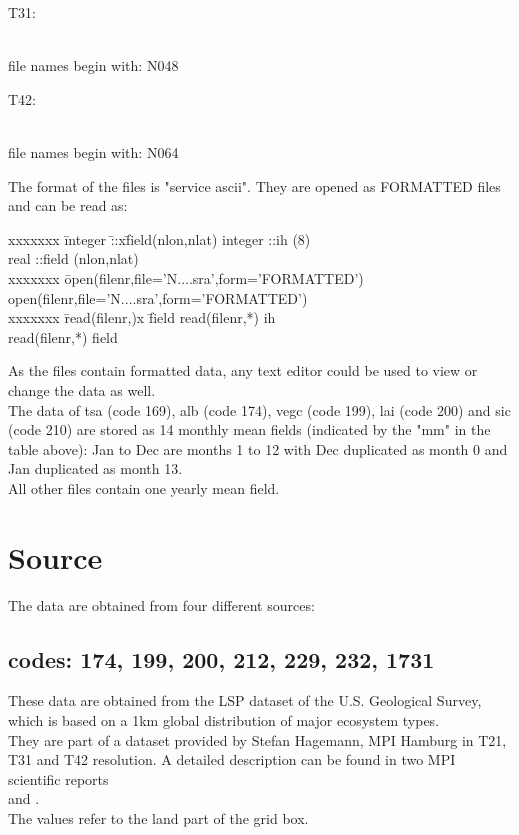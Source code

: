 \vspace{-1.6ex}
\noindent \begin{bf}T31:\end{bf}\\
file names begin with: N048 \\

\noindent \begin{bf}T42:\end{bf}\\
file names begin with: N064 \\
\vspace{3.ex}

The format of the files is "service ascii". They are opened as {\small FORMATTED} files and can be read as:

\begin{tabbing}
xxxxxxx \= integer \=::x\=field(nlon,nlat) \kill
        \> integer \>::\>ih (8)\\
        \> real    \>::\>field (nlon,nlat)\\[0.8ex]
xxxxxxx \= open(filenr,file='N....sra',form='{\small FORMATTED}') \kill
        \> open(filenr,file='N....sra',form='{\small FORMATTED}') \\
xxxxxxx \= read(filenr,)x \= field \kill
        \> read(filenr,*)    \> ih \\
        \> read(filenr,*)    \> field \\
\end{tabbing}

As the files contain formatted data, any text editor could be used to view or change the data as well.\\
The data of tsa (code 169), alb (code 174), vegc (code 199), lai (code 200) and sic (code 210) are stored as 
14 monthly mean fields (indicated by the "mm" in the table above): 
Jan to Dec are months 1 to 12 with Dec duplicated as month 0 and Jan duplicated as month 13.\\
All other files contain one yearly mean field.\\

\section{Source}
 The data are obtained from four different sources:
\subsection{codes: 174, 199, 200, 212, 229, 232, 1731}
These data are obtained from the LSP dataset of the U.S. Geological Survey, 
which is based on a 1km global distribution of major ecosystem types.\\
They are part of a dataset provided by Stefan Hagemann, MPI Hamburg in T21, T31 and T42 resolution. 
A detailed description can be found in two MPI scientific reports\\ \cite{hagemann1999} and \cite{hagemann2002}.\\
The values refer to the land part of the grid box.

